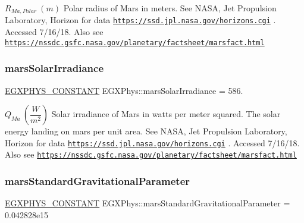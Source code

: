 $R_{Ma,Polar} \ (m)$ Polar radius of Mars in meters. See N\+A\+SA, Jet Propulsion Laboratory, Horizon for data \href{https://ssd.jpl.nasa.gov/horizons.cgi}{\tt https\+://ssd.\+jpl.\+nasa.\+gov/horizons.\+cgi} . Accessed 7/16/18. Also see \href{https://nssdc.gsfc.nasa.gov/planetary/factsheet/marsfact.html}{\tt https\+://nssdc.\+gsfc.\+nasa.\+gov/planetary/factsheet/marsfact.\+html} \mbox{\label{group___e_g_x_phys-_constants-_astrophysics-_solar_system-_mars-_bulk_gaf4647940197398f1f5b28c24efbbd50e}} 
\subsubsection{\texorpdfstring{mars\+Solar\+Irradiance}{marsSolarIrradiance}}
{\footnotesize\ttfamily \mbox{\hyperlink{group___e_g_x_phys-_constants-_macros_ga76980d288494ce1714c9ac68a95ba702}{E\+G\+X\+P\+H\+Y\+S\+\_\+\+C\+O\+N\+S\+T\+A\+NT}} E\+G\+X\+Phys\+::mars\+Solar\+Irradiance = 586.}

$ Q_{Ma} \ (\dfrac{W}{m^2})$ Solar irradiance of Mars in watts per meter squared. The solar energy landing on mars per unit area. See N\+A\+SA, Jet Propulsion Laboratory, Horizon for data \href{https://ssd.jpl.nasa.gov/horizons.cgi}{\tt https\+://ssd.\+jpl.\+nasa.\+gov/horizons.\+cgi} . Accessed 7/16/18. Also see \href{https://nssdc.gsfc.nasa.gov/planetary/factsheet/marsfact.html}{\tt https\+://nssdc.\+gsfc.\+nasa.\+gov/planetary/factsheet/marsfact.\+html} \mbox{\label{group___e_g_x_phys-_constants-_astrophysics-_solar_system-_mars-_bulk_gaed58caacb1033aed7f065712d3740b80}} 
\subsubsection{\texorpdfstring{mars\+Standard\+Gravitational\+Parameter}{marsStandardGravitationalParameter}}
{\footnotesize\ttfamily \mbox{\hyperlink{group___e_g_x_phys-_constants-_macros_ga76980d288494ce1714c9ac68a95ba702}{E\+G\+X\+P\+H\+Y\+S\+\_\+\+C\+O\+N\+S\+T\+A\+NT}} E\+G\+X\+Phys\+::mars\+Standard\+Gravitational\+Parameter = 0.\+042828e15}

